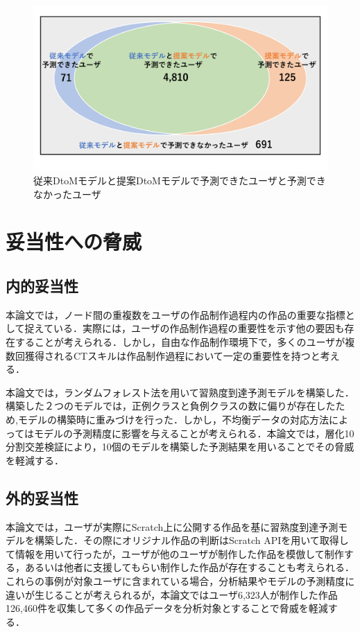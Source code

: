 \documentclass[11pt,dvipdfmx]{jreport}
\begin{document}
\begin{figure}[t]
	\centering
	\includegraphics[width=1.0\linewidth]{Okamoto_fig/dtom-venn.pdf}
        \vspace{-15mm}
	\caption{従来DtoMモデルと提案DtoMモデルで予測できたユーザと予測できなかったユーザ}
	\label{fig:dtom-venn}
\end{figure}



\chapter{妥当性への脅威}
\section{内的妥当性}

本論文では，ノード間の重複数をユーザの作品制作過程内の作品の重要な指標として捉えている．実際には，ユーザの作品制作過程の重要性を示す他の要因も存在することが考えられる．しかし，自由な作品制作環境下で，多くのユーザが複数回獲得されるCTスキルは作品制作過程において一定の重要性を持つと考える．

本論文では，ランダムフォレスト法を用いて習熟度到達予測モデルを構築した．構築した２つのモデルでは，正例クラスと負例クラスの数に偏りが存在したため,モデルの構築時に重みづけを行った．しかし，不均衡データの対応方法によってはモデルの予測精度に影響を与えることが考えられる．本論文では，層化10分割交差検証により，10個のモデルを構築した予測結果を用いることでその脅威を軽減する．

\section{外的妥当性}

本論文では，ユーザが実際にScratch上に公開する作品を基に習熟度到達予測モデルを構築した．その際にオリジナル作品の判断はScratch APIを用いて取得して情報を用いて行ったが，ユーザが他のユーザが制作した作品を模倣して制作する，あるいは他者に支援してもらい制作した作品が存在することも考えられる．これらの事例が対象ユーザに含まれている場合，分析結果やモデルの予測精度に違いが生じることが考えられるが，本論文ではユーザ6,323人が制作した作品126,460件を収集して多くの作品データを分析対象とすることで脅威を軽減する．
\end{document}
